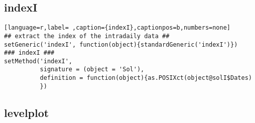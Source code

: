 \subsection{indexI}
\label{sec:org6a443d2}
\label{subsec:indexi}
\begin{lstlisting}[language=r,label= ,caption={indexI},captionpos=b,numbers=none]
## extract the index of the intradaily data ##
setGeneric('indexI', function(object){standardGeneric('indexI')})
### indexI ###
setMethod('indexI',
          signature = (object = 'Sol'),
          definition = function(object){as.POSIXct(object@solI$Dates)
          })
\end{lstlisting}
\subsection{levelplot}
\label{sec:orgd21750d}
\label{subsec:levelplot}
